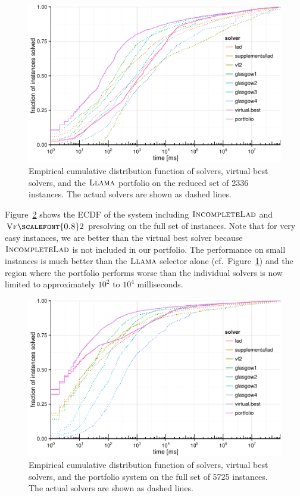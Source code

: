 \documentclass{llncs}
\newcommand{\VFtwo}{$\textsc{Vf{\scalefont{0.8}2}}$\xspace}
\newcommand{\IncompleteLAD}{$\textsc{IncompleteLad}$\xspace}
\newcommand{\LLAMA}{$\textsc{Llama}$\xspace}
\begin{document}
\begin{figure}[!ht]
\includegraphics[width=\textwidth]{figures/portfolio-ecdf}
\caption{Empirical cumulative distribution function of solvers, virtual best
solvers, and the \LLAMA portfolio on the reduced set of 2336 instances. The
actual solvers are shown as dashed lines.}
\label{fig:portfolio-ecdf}
\end{figure}

Figure~\ref{fig:portfolio-ecdf-full} shows the ECDF of the system including
\IncompleteLAD and \VFtwo presolving on the full set of instances. Note that for
very easy instances, we are better than the virtual best solver because
\IncompleteLAD is not included in our portfolio. The performance on small
instances is much better than the \LLAMA selector alone (cf.\
Figure~\ref{fig:portfolio-ecdf}) and the region where the portfolio performs
worse than the individual solvers is now limited to approximately $10^2$ to
$10^4$ milliseconds.

\begin{figure}[!ht]
\includegraphics[width=\textwidth]{figures/portfolio-ecdf-full}
\caption{Empirical cumulative distribution function of solvers, virtual best
solvers, and the portfolio system on the full set of 5725 instances. The
actual solvers are shown as dashed lines.}
\label{fig:portfolio-ecdf-full}
\end{figure}
\end{document}
